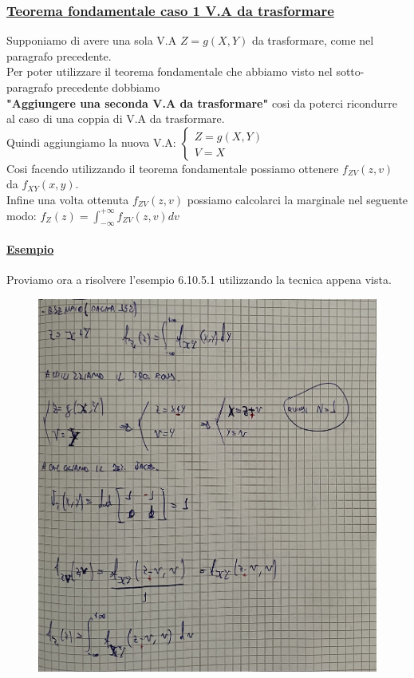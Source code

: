 \documentclass{article}
\begin{document}
\subsubsection{\underline{Teorema fondamentale caso 1 V.A da trasformare}}
Supponiamo di avere una sola V.A $Z = g(X,Y)$ da trasformare, come nel paragrafo precedente. \\
Per poter utilizzare il teorema fondamentale che abbiamo visto nel sotto-paragrafo precedente dobbiamo \\ \textbf{"Aggiungere una seconda V.A da trasformare"} cosi da poterci ricondurre al caso di una coppia di V.A da trasformare. \\
Quindi aggiungiamo la nuova V.A: $\begin{cases}
    Z = g(X,Y) \\
    V = X
\end{cases}$ \\
Cosi facendo utilizzando il teorema fondamentale possiamo ottenere $f_{ZV}(z,v)$ da $f_{XY}(x,y)$. \\
Infine una volta ottenuta $f_{ZV}(z,v)$ possiamo calcolarci la marginale nel seguente modo: $f_Z(z) = \int_{-\infty}^{+\infty} f_{ZV}(z,v) dv$
\paragraph{\underline{Esempio}}
Proviamo ora a risolvere l'esempio 6.10.5.1 utilizzando la tecnica appena vista.
\begin{figure}[ht]
\centering
\includegraphics[scale=0.16]{ese/48.jpeg}
\end{figure} 
\end{document}
